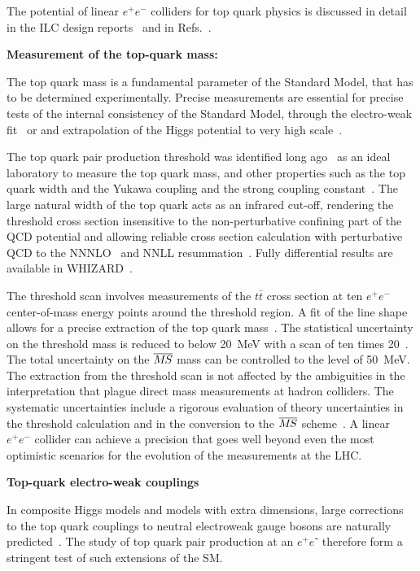 The potential of linear $e^+e^-$ colliders for top quark physics is discussed in detail in the ILC design reports~\cite{}
and in Refs.~\cite{Agashe:2013hma,Vos:2016til,Abramowicz:2018rjq}.

{\bf Measurement of the top-quark mass:}

The top quark mass is a fundamental parameter of the Standard Model, that has to be
determined experimentally. Precise measurements are essential for precise tests of
the internal consistency of the Standard Model, through the electro-weak
fit~\cite{Baak:2014ora} or and extrapolation of the Higgs potential to very high
scale~\cite{Degrassi:2012ry}.

The top quark pair production threshold was identified long ago~\cite{Gusken:1985nf} as
an ideal laboratory to measure the top quark mass, and other properties such as the top quark
width and the Yukawa coupling and the strong coupling constant~\cite{Strassler:1990nw}.
The large natural width of the top quark acts as an infrared cut-off,
rendering the threshold cross section insensitive to the non-perturbative confining part
of the QCD potential and allowing reliable cross section calculation with perturbative QCD
to the NNNLO~\cite{Beneke:2015kwa} and NNLL resummation~\cite{Hoang:2013uda}. Fully
differential results are available in WHIZARD~\cite{Bach:2017ggt}.

The threshold scan involves measurements of the $t\bar{t}$ cross section at ten $e^+e^-$
center-of-mass energy points around the threshold region. A fit of the line shape allows for
a precise extraction of the top quark mass~\cite{Martinez:2002st,Horiguchi:2013wra,Seidel:2013sqa}.
The statistical uncertainty on the threshold mass is reduced to below 20~MeV with a scan of
ten times 20~\ifb. The total uncertainty on the $\msb$ mass can be controlled to the level
of 50~MeV. The extraction from the threshold scan is not affected by the ambiguities in the
interpretation that plague direct mass measurements at hadron colliders. The systematic uncertainties
include a rigorous evaluation of theory uncertainties in the threshold calculation and in the conversion
to the $\msb$ scheme~\cite{Simon:2016pwp}. A linear $e^+e^-$ collider can achieve a precision that goes well beyond
even the most optimistic scenarios for the evolution of the measurements at the LHC.


{\bf Top-quark electro-weak couplings}

In composite Higgs models and models with extra dimensions, large corrections to the top quark couplings to
neutral electroweak gauge bosons are naturally predicted~\cite{Richard:2014upa,Barducci:2015aoa,Durieux:2018ekg}.
The study of top quark pair production at an $e^+e⁻$ therefore form a stringent test of such extensions of the SM.

